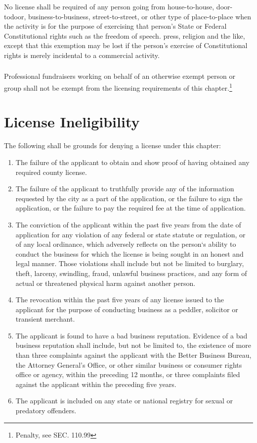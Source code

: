 \subsubsection{}
No license shall be required of any person going from house-to-house, door-todoor, business-to-business, street-to-street, or other type of place-to-place when the activity is for the purpose of exercising that person's State or Federal Constitutional rights such as the freedom of speech. press, religion and the like, except that this exemption may be lost if the person's exercise of Constitutional rights is merely incidental to a commercial activity.
\subsubsection{}
Professional fundraisers working on behalf of an otherwise exempt person or group shall not be exempt from the licensing requirements of this chapter.\footnote{Penalty, see SEC. 110.99}

\section{License Ineligibility}
The following shall be grounds for denying a license under this chapter:
\begin{enumerate}[{\indent}A)]
    \item The failure of the applicant to obtain and show proof of having obtained any required county license.
    \item The failure of the applicant to truthfully provide any of the information requested by the city as a part of the application, or the failure to sign the application, or the failure to pay the required fee at the time of application.
    \item The conviction of the applicant within the past five years from the date of application for any violation of any federal or state statute or regulation, or of any local ordinance, which adversely reflects on the person‘s ability to conduct the business for which the license is being sought in an honest and legal manner. Those violations shall include but not be limited to burglary, theft, larceny, swindling, fraud, unlawful business practices, and any form of actual or threatened physical harm against another person.
    \item The revocation within the past five years of any license issued to the applicant for the purpose of conducting business as a peddler, solicitor or transient merchant.
    \item The applicant is found to have a bad business reputation. Evidence of a bad business reputation shall include, but not be limited to, the existence of more than three complaints against the applicant with the Better Business Bureau, the Attorney General’s Office, or other similar business or consumer rights office or agency, within the preceding 12 months, or three complaints filed against the applicant within the preceding five years.
    \item The applicant is included on any state or national registry for sexual or predatory offenders.
\end{enumerate}

